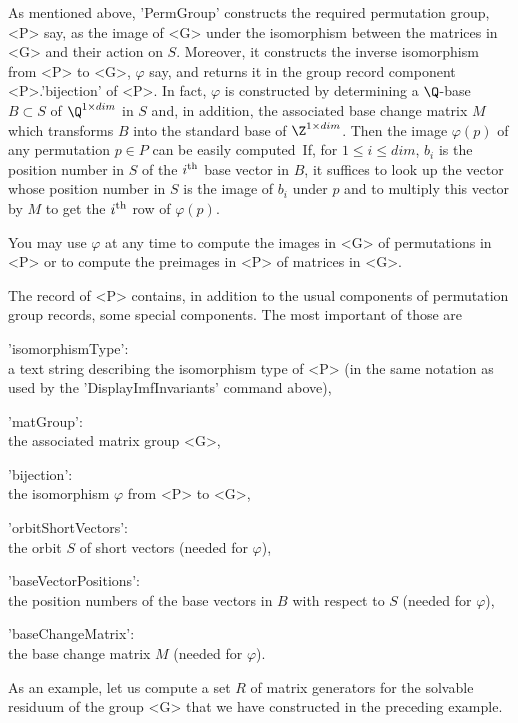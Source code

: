 As mentioned  above,  'PermGroup'   constructs  the required  permutation
group,  <P> say, as  the image of  <G> under  the isomorphism between the
matrices in <G>  and their action   on $S$.  Moreover, it  constructs the
inverse isomorphism from <P> to <G>, $\varphi$ say, and returns it in the
group record component <P>.'bijection'  of  <P>.  In fact,  $\varphi$  is
constructed by determining  a  $\Q$-base $B \subset  S$  of $\Q^{1 \times
dim}$ in   $S$ and, in  addition, the  associated base change  matrix $M$
which transforms $B$ into the standard base  of $\Z^{1 \times dim}$. Then
the image $\varphi(p)$  of  any  permutation $p  \in  P$ can   be  easily
computed\:\ If, for $1 \leq i \leq dim$,  $b_i$ is the position number in
$S$ of  the $i^{\rm th}$ base vector  in $B$, it  suffices to look up the
vector whose position number in  $S$ is the  image of $b_i$ under $p$ and
to   multiply  this  vector by  $M$   to  get the   $i^{\rm  th}$  row of
$\varphi(p)$.

You  may  use $\varphi$ at  any   time to compute  the  images  in <G> of
permutations in  <P> or to  compute the  preimages in  <P> of matrices in
<G>.

The record  of  <P> contains,   in addition  to the usual   components of
permutation group records, some special components. The most important of
those are\:

'isomorphismType': \\
      a text string describing the isomorphism type of  <P>  (in the same
      notation as used by the 'DisplayImfInvariants' command above),

'matGroup': \\
      the associated matrix group <G>,

'bijection': \\
      the isomorphism $\varphi$ from <P> to <G>,

'orbitShortVectors': \\
      the orbit $S$ of short vectors (needed for $\varphi$),

'baseVectorPositions': \\
      the position numbers of the base vectors in $B$ with respect to $S$
      (needed for $\varphi$),

'baseChangeMatrix': \\
      the base change matrix $M$ (needed for $\varphi$).

As an example, let   us compute a set  $R$  of matrix generators  for the
solvable residuum  of  the group  <G>  that  we  have constructed in  the
preceding example.

